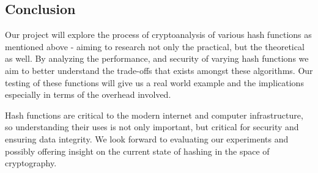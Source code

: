 \documentclass[12pt,english]{article}
\begin{document}
\subsection*{Conclusion}
Our project will explore the process of cryptoanalysis of various 
hash functions as mentioned above - aiming to research not 
only the practical, but the theoretical as well. 
By analyzing the performance, 
and security of varying hash functions we aim to 
better understand the trade-offs that exists amongst 
these algorithms. Our testing of these functions will 
give us a real world example and the implications especially 
in terms of the overhead involved.

Hash functions are critical to the modern internet 
and computer infrastructure, so understanding their uses 
is not only important, but critical for security and ensuring 
data integrity. We look forward to evaluating our experiments 
and possibly offering insight on the current state of hashing 
in the space of cryptography.
\end{document}

